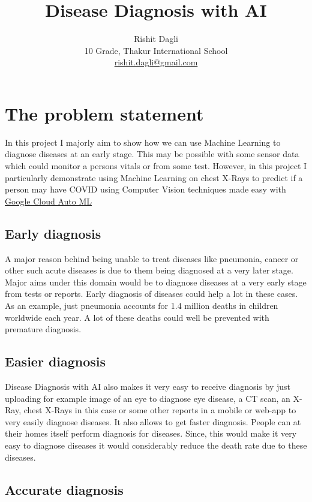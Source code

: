 \documentclass[a4paper]{article}
\title{Disease Diagnosis with AI}
\author{Rishit Dagli \\ 
        10 Grade, Thakur International School \\
        \href{mailto:rishit.dagli@gmail.com}{rishit.dagli@gmail.com} }
\date{}
\begin{document}
\maketitle

\tableofcontents

\section{The problem statement}

In this project I majorly aim to show how we can use Machine Learning to diagnose diseases at an early stage. This may be possible with some sensor data which could monitor a persons vitals or from some test. However, in this project I particularly demonstrate using Machine Learning on chest X-Rays to predict if a person may have COVID using Computer Vision techniques made easy with \href{https://cloud.google.com/automl}{Google Cloud Auto ML}

\subsection{Early diagnosis}

\qquad A major reason behind being unable to treat diseases like pneumonia, cancer or other such acute diseases is due to them being diagnosed at a very later stage. Major aims under this domain would be to diagnose diseases at a very early stage from tests or reports. Early diagnosis of diseases could help a lot in these cases. As an example, just pneumonia accounts for 1.4 million deaths in children worldwide each year. A lot of these deaths could well be prevented with premature diagnosis. 

\subsection{Easier diagnosis}

\qquad Disease Diagnosis with AI also makes it very easy to receive diagnosis by just uploading for example image of an eye to diagnose eye disease, a CT scan, an X-Ray, chest X-Rays in this case or some other reports in a mobile or web-app to very easily diagnose diseases. It also allows to get faster diagnosis. People can at their homes itself perform diagnosis for diseases. Since, this would make it very easy to diagnose diseases it would considerably reduce the death rate due to these diseases.

\subsection{Accurate diagnosis}
\end{document}

